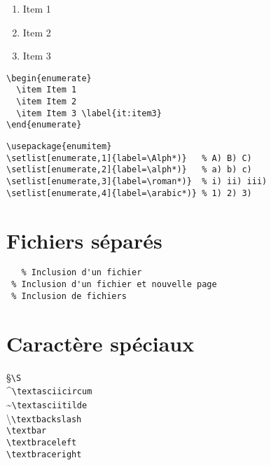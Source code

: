 \documentclass{article}
\let\code\lstinline
\begin{document}
\begin{multicols*}{3}
\begin{minipage}[c]{0.3\linewidth}
\begin{enumerate}
  \item Item 1
  \item Item 2
  \item Item 3
\end{enumerate}
\end{minipage}
\begin{minipage}[c]{0.6\linewidth}
\begin{lstlisting}
\begin{enumerate}
  \item Item 1
  \item Item 2
  \item Item 3 \label{it:item3}
\end{enumerate}
\end{lstlisting}
\end{minipage}
\begin{lstlisting}
\usepackage{enumitem}
\setlist[enumerate,1]{label=\Alph*)}   % A) B) C)
\setlist[enumerate,2]{label=\alph*)}   % a) b) c)
\setlist[enumerate,3]{label=\roman*)}  % i) ii) iii)
\setlist[enumerate,4]{label=\arabic*)} % 1) 2) 3)
\end{lstlisting}

\section*{Fichiers séparés}
\begin{lstlisting}
   % Inclusion d'un fichier
 % Inclusion d'un fichier et nouvelle page
 % Inclusion de fichiers
\end{lstlisting}

\section*{Caractère spéciaux}
\begin{multicols*}{3}
\S \code+\S+ \\
\textasciicircum \code+\textasciicircum+ \\
\textasciitilde \code+\textasciitilde+ \\
\textbackslash \code+\textbackslash+ \\
\textbar \code+\textbar+ \\
\textbraceleft \code+\textbraceleft+ \\
\textbraceright \code+\textbraceright+ \\
\end{multicols*}



\end{multicols*}
\end{document}
